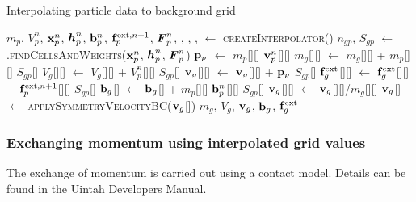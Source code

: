 \begin{breakablealgorithm}
  \caption{Interpolating particle data to background grid}
  \begin{algorithmic}[1]
    \Require $m_p$, $V_p^n$, $\mathbf{x}_p^n$, $\boldsymbol{h}_p^n$, $\mathbf{b}_p^n$, $\mathbf{f}^{\text{ext},n+1}_p$, $\boldsymbol{F}_p^n$,
             , , 
             , 
      \State {} $\leftarrow$ \textsc{createInterpolator}()
          \State $n_{gp}$, $S_{gp}$ $\leftarrow$ 
            .\textsc{findCellsAndWeights}($\mathbf{x}_p^n$, $\boldsymbol{h}_p^n$, $\boldsymbol{F}_p^n$)
          \State $\mathbf{p}_p$ $\leftarrow$ $m_p$[\TTmatl][\TTpart] $\mathbf{v}_p^n$[\TTmatl][\TTpart] 
            \State $m_g$[\TTmatl][\TTnode] $\leftarrow$ $m_g$[\TTmatl][\TTnode] + $m_p$[\TTmatl][\TTpart] $S_{gp}$[\TTnode]
            \State $V_g$[\TTmatl][\TTnode] $\leftarrow$ $V_g$[\TTmatl][\TTnode] + $V_p^n$[\TTmatl][\TTpart] $S_{gp}$[\TTnode]
            \State $\mathbf{v}_g$[\TTmatl][\TTnode] $\leftarrow$ $\mathbf{v}_g$[\TTmatl][\TTnode] + $\mathbf{p}_p$ $S_{gp}$[\TTnode]
            \State $\mathbf{f}^{\text{ext}}_g$[\TTmatl][\TTnode] $\leftarrow$ $\mathbf{f}^{\text{ext}}_g$[\TTmatl][\TTnode] + $\mathbf{f}^{\text{ext},n+1}_p$[\TTmatl][\TTpart] $S_{gp}$[\TTnode]
            \State $\mathbf{b}_g$[\TTnode] $\leftarrow$ $\mathbf{b}_g$[\TTnode] + $m_p$[\TTmatl][\TTpart] $\mathbf{b}^n_p$[\TTmatl][\TTpart] $S_{gp}$[\TTnode]
          \EndFor
        \EndFor
          \State $\mathbf{v}_g$[\TTmatl][\TTnode] $\leftarrow$ $\mathbf{v}_g$[\TTmatl][\TTnode]/$m_g$[\TTmatl][\TTnode]
        \EndFor
        \State $\mathbf{v}_g$[\TTmatl] $\leftarrow$ \textsc{applySymmetryVelocityBC}($\mathbf{v}_g$[\TTmatl])
      \EndFor
      \State \Return $m_g$, $V_g$, $\mathbf{v}_g$, $\mathbf{b}_g$, $\mathbf{f}_g^{\text{ext}}$
    \EndProcedure
  \end{algorithmic}
\end{breakablealgorithm}

\subsubsection{Exchanging momentum using interpolated grid values}
The exchange of momentum is carried out using a contact model.  Details can be found in the
Uintah Developers Manual.

